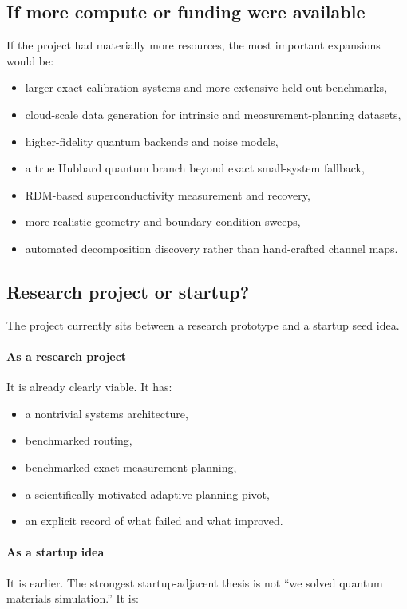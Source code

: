 \documentclass[11pt]{article}
\begin{document}
\subsection{If more compute or funding were available}

If the project had materially more resources, the most important expansions would be:

\begin{itemize}
\item larger exact-calibration systems and more extensive held-out benchmarks,
\item cloud-scale data generation for intrinsic and measurement-planning datasets,
\item higher-fidelity quantum backends and noise models,
\item a true Hubbard quantum branch beyond exact small-system fallback,
\item RDM-based superconductivity measurement and recovery,
\item more realistic geometry and boundary-condition sweeps,
\item automated decomposition discovery rather than hand-crafted channel maps.
\end{itemize}

\subsection{Research project or startup?}

The project currently sits between a research prototype and a startup seed idea.

\paragraph{As a research project}
It is already clearly viable. It has:

\begin{itemize}
\item a nontrivial systems architecture,
\item benchmarked routing,
\item benchmarked exact measurement planning,
\item a scientifically motivated adaptive-planning pivot,
\item an explicit record of what failed and what improved.
\end{itemize}

\paragraph{As a startup idea}
It is earlier. The strongest startup-adjacent thesis is not ``we solved quantum materials simulation.'' It is:
\end{document}
